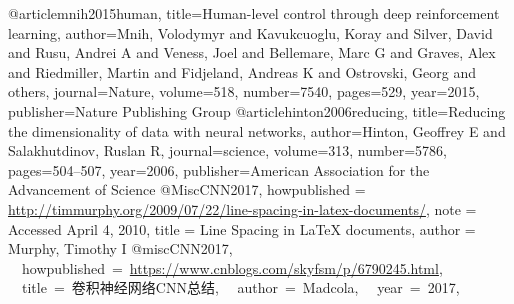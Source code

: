 @article{mnih2015human,
  title={Human-level control through deep reinforcement learning},
  author={Mnih, Volodymyr and Kavukcuoglu, Koray and Silver, David and Rusu, Andrei A and Veness, Joel and Bellemare, Marc G and Graves, Alex and Riedmiller, Martin and Fidjeland, Andreas K and Ostrovski, Georg and others},
  journal={Nature},
  volume={518},
  number={7540},
  pages={529},
  year={2015},
  publisher={Nature Publishing Group}
}
@article{hinton2006reducing,
  title={Reducing the dimensionality of data with neural networks},
  author={Hinton, Geoffrey E and Salakhutdinov, Ruslan R},
  journal={science},
  volume={313},
  number={5786},
  pages={504--507},
  year={2006},
  publisher={American Association for the Advancement of Science}
}
@Misc{CNN2017,
howpublished = {\url{http://timmurphy.org/2009/07/22/line-spacing-in-latex-documents/}},
note = {Accessed April 4, 2010},
title = {Line Spacing in LaTeX documents},
author = {Murphy, Timothy I}
}
@misc{CNN2017,
  howpublished = {\url{https://www.cnblogs.com/skyfsm/p/6790245.html}},
  title = {卷积神经网络CNN总结},
  author = {Madcola},
  year = 2017,
}

